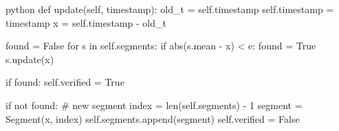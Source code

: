 \begin{mintedbox}{python}
def update(self, timestamp):
    old_t = self.timestamp 
    self.timestamp = timestamp
    x = self.timestamp - old_t
    
    found = False
    for s in self.segments:
        if abs(s.mean - x) < e:
            found = True
            s.update(x) 
    
    if found:
        self.verified = True

    if not found:
        # new segment
        index = len(self.segments) - 1
        segment = Segment(x, index)
        self.segments.append(segment)
        self.verified = False
\end{mintedbox}